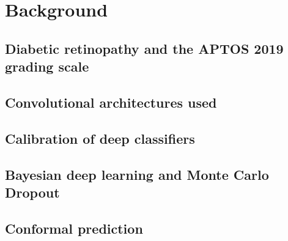 \chapter{Background}
\label{ch:background}


\section{Diabetic retinopathy and the APTOS 2019 grading scale}

\section{Convolutional architectures used}

\section{Calibration of deep classifiers}

\section{Bayesian deep learning and Monte Carlo Dropout}

\section{Conformal prediction}

